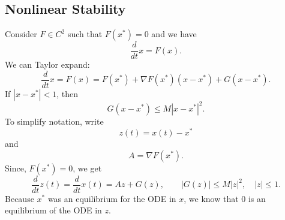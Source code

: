 \documentclass{tufte-handout}
\theoremstyle{definition}
\begin{document}
\subsection{Nonlinear Stability}

Consider $F \in C^2$ such that $F(x^*) = 0$ and we have \[
	\frac{d}{dt}x = F(x)
.\] We can Taylor expand: \[
	\frac{d}{dt}x = F(x) = F(x^*) + \nabla F(x^*) (x-x^*) + G(x-x^*)
.\] If $\left| x-x^* \right| < 1$, then \[
	G(x-x^*) \le M \left| x-x^* \right|^2
.\] To simplify notation, write \[
	z(t) = x(t) - x^*
\] and \[
	A = \nabla F(x^*)
.\] Since, $F(x^*) = 0$, we get \[
	\frac{d}{dt} z(t) = \frac{d}{dt}x(t) = Az + G(z),\qquad \left| G(z) \right|\le M \left| z \right|^2, \quad \left| z  \right|\le 1
.\] Because $x^*$ was an equilibrium for the ODE in $x$, we know that $0$ is an equilibrium of the ODE in $z$. 
\end{document}
